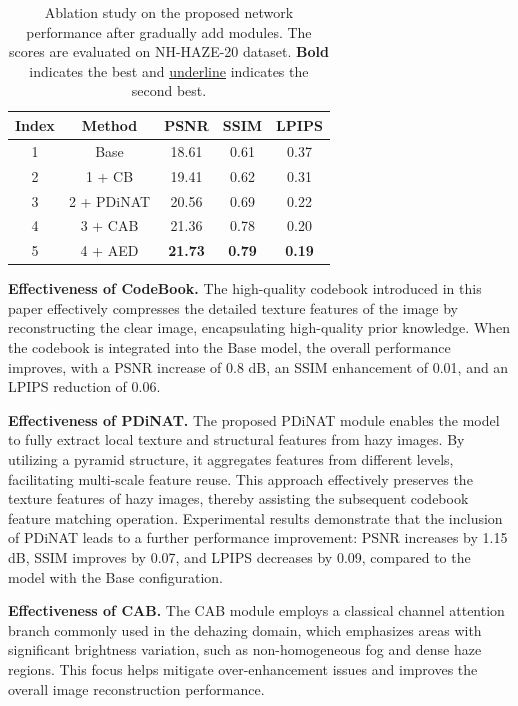 \documentclass[journal]{IEEEtran}
\begin{document}
\begin{table}
	\begin{center}
		\caption{Ablation study on the proposed network performance after gradually add modules. The scores are evaluated on NH-HAZE-20 dataset. \textbf{Bold} indicates the best and \underline{underline} indicates the second best.}
		\label{Ablation_study_1}
		\begin{tabular}{c | c | c | c | c }
			\hline
			Index & Method     & PSNR           & SSIM          & LPIPS         \\
			\hline
			1     & Base       & 18.61          & 0.61          & 0.37          \\
			2     & 1 + CB     & 19.41          & 0.62          & 0.31          \\
			3     & 2 + PDiNAT & 20.56          & 0.69          & 0.22          \\
			4     & 3 + CAB    & 21.36          & 0.78          & 0.20          \\
			5     & 4 + AED    & \textbf{21.73} & \textbf{0.79} & \textbf{0.19} \\
			\hline
		\end{tabular}
	\end{center}
\end{table}

{\bf{Effectiveness of CodeBook.}} The high-quality codebook introduced in this paper effectively compresses the detailed texture features of the image by reconstructing the clear image, encapsulating high-quality prior knowledge. When the codebook is integrated into the Base model, the overall performance improves, with a PSNR increase of 0.8 dB, an SSIM enhancement of 0.01, and an LPIPS reduction of 0.06.

	{\bf{Effectiveness of PDiNAT.}} The proposed PDiNAT module enables the model to fully extract local texture and structural features from hazy images. By utilizing a pyramid structure, it aggregates features from different levels, facilitating multi-scale feature reuse. This approach effectively preserves the texture features of hazy images, thereby assisting the subsequent codebook feature matching operation. Experimental results demonstrate that the inclusion of PDiNAT leads to a further performance improvement: PSNR increases by 1.15 dB, SSIM improves by 0.07, and LPIPS decreases by 0.09, compared to the model with the Base configuration.

	{\bf{Effectiveness of CAB.}} The CAB module employs a classical channel attention branch commonly used in the dehazing domain, which emphasizes areas with significant brightness variation, such as non-homogeneous fog and dense haze regions. This focus helps mitigate over-enhancement issues and improves the overall image reconstruction performance.
\end{document}
